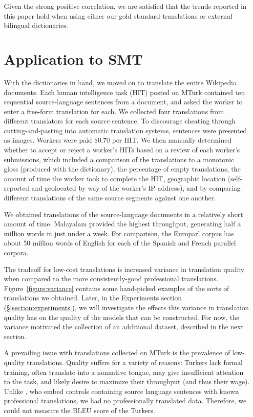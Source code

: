 \documentclass[11pt]{article}
\begin{document}
Given the strong positive correlation, we are satisfied that the trends reported in this paper hold when using either our gold standard translations or external bilingual dictionaries. 

\section{Application to SMT}
With the dictionaries in hand, we moved on to translate the entire
Wikipedia documents.  Each human intelligence task (HIT) posted on
MTurk contained ten sequential source-language sentences from a
document, and asked the worker to enter a free-form translation for
each.  We collected four translations from different translators for
each source sentence.  To discourage cheating through
cutting-and-pasting into automatic translation systems, sentences were
presented as images.  Workers were paid \$0.70 per HIT.  We then
manually determined whether to accept or reject a worker's HITs based
on a review of each worker's submissions, which included a comparison
of the translations to a monotonic gloss (produced with the
dictionary), the percentage of empty translations, the amount of time
the worker took to complete the HIT, geographic
location (self-reported and geolocated by way of the worker's
IP address), and by comparing different translations of the same
source segments against one another.

We obtained translations of the
source-language documents in a relatively short amount of time. Malayalam provided the highest throughput,
generating half a million words in just under a week.  For comparison,
the Europarl corpus \cite{koehn2005europarl} has about 50 million
words of English for each of the Spanish and French parallel corpora.

The tradeoff for low-cost translations is increased variance in
translation quality when compared to the more consistently-good
professional translations.  Figure~\ref{figure:variance} contains some
hand-picked examples of the sorts of translations we obtained.  Later,
in the Experiments section (\S\ref{section:experiments}), we will
investigate the effects this variance in translation quality has on
the quality of the models that can be constructed.  For now, the
variance motivated the collection of an additional dataset, described
in the next section.

A prevailing issue with translations collected on MTurk is the
prevalence of low-quality translations.  Quality suffers for a variety
of reasons: Turkers lack formal training, often translate into a
nonnative tongue, may give insufficient attention to the task, and
likely desire to maximize their throughput (and thus their wage).
Unlike , who embed controls
containing source language sentences with known professional
translations, we had no professionally translated data.  Therefore, we
could not measure the BLEU score of the Turkers.
\end{document}
